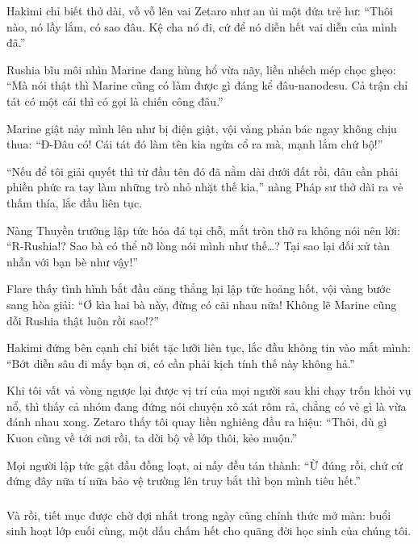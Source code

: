 \documentclass[../main.tex]{subfiles}
\begin{document}
Hakimi chỉ biết thở dài, vỗ vỗ lên vai Zetaro như an ủi một đứa trẻ hư: ``Thôi nào, nó lầy lắm, có sao đâu. Kệ cha nó đi, cứ để nó diễn hết vai diễn của mình đã.''

Rushia bĩu môi nhìn Marine đang hùng hổ vừa nãy, liền nhếch mép chọc ghẹo: ``Mà nói thật thì Marine cũng có làm được gì đáng kể đâu-nanodesu. Cả trận chỉ tát có một cái thì có gọi là chiến công đâu.''

Marine giật nảy mình lên như bị điện giật, vội vàng phản bác ngay không chịu thua: ``Đ-Đâu có! Cái tát đó làm tên kia ngửa cổ ra mà, mạnh lắm chứ bộ!''

``Nếu để tôi giải quyết thì từ đầu tên đó đã nằm dài dưới đất rồi, đâu cần phải phiền phức ra tay làm những trò nhỏ nhặt thế kia,'' nàng Pháp sư thở dài ra vẻ thấm thía, lắc đầu liên tục.

Nàng Thuyền trưởng lập tức hóa đá tại chỗ, mắt tròn thở ra không nói nên lời: ``R-Rushia!? Sao bà có thể nỡ lòng nói mình như thế\dots? Tại sao lại đối xử tàn nhẫn với bạn bè như vậy!''

Flare thấy tình hình bắt đầu căng thẳng lại lập tức hoảng hốt, vội vàng bước sang hòa giải: ``Ơ kìa hai bà này, đừng có cãi nhau nữa! Không lẽ Marine cũng dỗi Rushia thật luôn rồi sao!?''

Hakimi đứng bên cạnh chỉ biết tặc lưỡi liên tục, lắc đầu không tin vào mắt mình: ``Bớt diễn sâu đi mấy bạn ơi, có cần phải kịch tính thế này không hả.''

Khi tôi vất vả vòng ngược lại được vị trí của mọi người sau khi chạy trốn khỏi vụ nổ, thì thấy cả nhóm đang đứng nói chuyện xô xát rôm rả, chẳng có vẻ gì là vừa đánh nhau xong. Zetaro thấy tôi quay liền nghiêng đầu ra hiệu: ``Thôi, dù gì Kuon cũng về tới nơi rồi, ta dời bộ về lớp thôi, kẻo muộn.''

Mọi người lập tức gật đầu đồng loạt, ai nấy đều tán thành: ``Ừ đúng rồi, chứ cứ đứng đây nữa tí nữa bảo vệ trường lên truy bắt thì bọn mình tiêu hết.''

\subsubsection*{\label{ep-C7.4}}

Và rồi, tiết mục được chờ đợi nhất trong ngày cũng chính thức mở màn: buổi sinh hoạt lớp cuối cùng, một dấu chấm hết cho quãng đời học sinh của chúng tôi.
\end{document}

